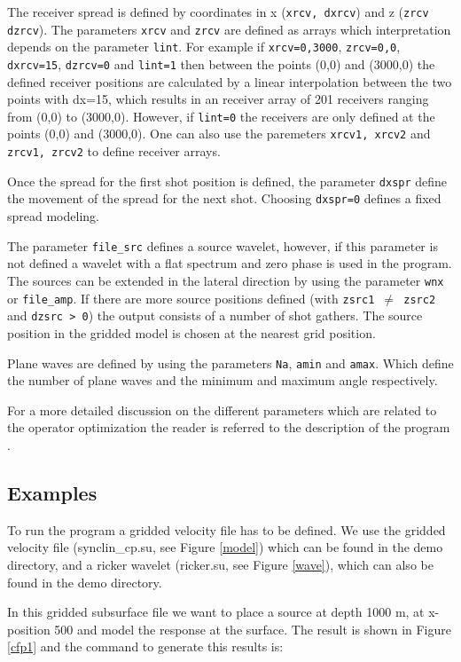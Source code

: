 The receiver spread is defined by coordinates in x ({\tt xrcv, dxrcv}) and z ({\tt zrcv dzrcv}). The parameters {\tt xrcv} and {\tt zrcv} are defined as arrays which interpretation depends on the parameter {\tt lint}. For example if {\tt xrcv=0,3000}, {\tt zrcv=0,0}, {\tt dxrcv=15}, {\tt dzrcv=0} and {\tt lint=1} then between the points (0,0) and (3000,0) the defined receiver positions are calculated by a linear interpolation between the two points with dx=15, which results in an receiver array of 201 receivers ranging from (0,0) to (3000,0). However, if {\tt lint=0} the receivers are only defined at the points (0,0) and (3000,0). One can also use the paremeters {\tt xrcv1, xrcv2} and {\tt zrcv1, zrcv2} to define receiver arrays.
 
Once the spread for the first shot position is defined, the parameter {\tt dxspr} define the movement of the spread for the next shot.  Choosing {\tt dxspr=0} defines a fixed spread modeling.

The parameter {\tt file\_src} defines a source wavelet, however, if this parameter is not defined a wavelet with a flat spectrum and zero phase is used in the program. 
The sources can be extended in the lateral direction by using the parameter {\tt wnx} or {\tt file\_amp}.  If there are more source positions defined (with {\tt zsrc1 $\not=$ zsrc2} and {\tt dzsrc > 0}) the output consists of a number of shot gathers. The source position in the gridded model is chosen at the nearest grid position.

Plane waves are defined by using the parameters {\tt Na}, {\tt amin} and {\tt amax}. Which define the number of plane waves and the minimum and maximum angle respectively. 

For a more detailed discussion on the different parameters which are related to the operator optimization the reader is referred to the description of the program .

\subsection{Examples}

To run the program a gridded velocity file has to be defined. We use the gridded velocity file (synclin\_cp.su, see Figure
\ref{model}) which can
be found in the demo directory, and a ricker wavelet (ricker.su, see Figure \ref{wave}), which can also be found in the demo directory.

In this gridded subsurface file we want to place a source at depth 1000 m, at x-position 500 and model the response at the surface.
The result is shown in Figure \ref{cfp1} and the command to generate this results is:


